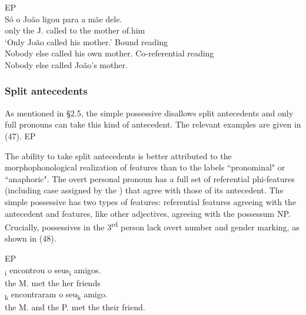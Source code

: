 \documentclass[output=paper]{langsci/langscibook}
\begin{document}
\ea%
         EP\label{ex:wein:46}\\
    \ea  
    \gll Só o João ligou para a mãe dele.  \\
         only the J. called to the mother of.him\\
    \glt ‘Only João called his mother.’
    \ex  Bound reading\\
         Nobody else called his own mother.
    \ex  Co-referential reading\\
         Nobody else called João’s mother.
    \z
\z



\subsubsection{Split antecedents}%

As mentioned in §2.5, the simple possessive disallows split antecedents and only full pronouns can take this kind of antecedent. The relevant examples are given in (47).
\pagebreak
\ea%
         EP\label{ex:wein:47}\\
    \z
\z

The ability to take split antecedents is better attributed to the morphophonological realization of features than to the labels “pronominal" or “anaphoric". The overt personal pronoun has a full set of referential phi-features (including case assigned by the ) that agree with those of its antecedent. The simple possessive has two types of features: referential features agreeing with the antecedent and  features, like other adjectives, agreeing with the possessum NP. Crucially, possessives in the 3\textsuperscript{rd} person lack overt number and gender marking, as shown in (48).

\ea%
         EP\label{ex:wein:48}\\
    \ea  
    \gll \relax [A Maria]\textsubscript{i} encontrou o seus\textsubscript{i} amigos.\\
         the M. met the her friends\\
    \ex  
    \gll {}\textsubscript{k} encontraram o seu\textsubscript{k} amigo.\\
         the M. and the P. met the their friend.\\
    \z
\z
\end{document}
